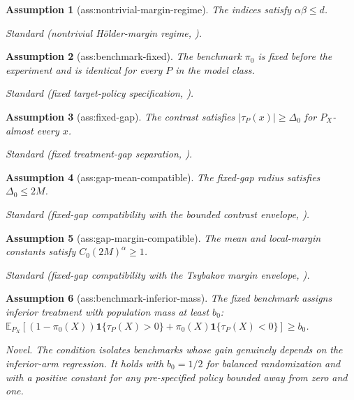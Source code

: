 \documentclass{article}
\newtheorem{assumption}{Assumption}
\begin{document}
\begin{assumption}[ass:nontrivial-margin-regime]\label{ass:nontrivial-margin-regime}
The indices satisfy \(\alpha\beta\le d\).
\par\smallskip\noindent\emph{Standard} (nontrivial Hölder-margin regime, \cite{PerchetRigollet2013CovariateBandits}).
\end{assumption}

\begin{assumption}[ass:benchmark-fixed]\label{ass:benchmark-fixed}
The benchmark \(\pi_0\) is fixed before the experiment and is identical for every \(P\) in the model class.
\par\smallskip\noindent\emph{Standard} (fixed target-policy specification, \cite{WaudbySmithEtAl2024AnytimeOffPolicy}).
\end{assumption}

\begin{assumption}[ass:fixed-gap]\label{ass:fixed-gap}
The contrast satisfies \(|\tau_P(x)|\ge\Delta_0\) for \(P_X\)-almost every \(x\).
\par\smallskip\noindent\emph{Standard} (fixed treatment-gap separation, \cite{SimchiLeviWang2023BanditExperimentalDesign}).
\end{assumption}

\begin{assumption}[ass:gap-mean-compatible]\label{ass:gap-mean-compatible}
The fixed-gap radius satisfies \(\Delta_0\le2M\).
\par\smallskip\noindent\emph{Standard} (fixed-gap compatibility with the bounded contrast envelope, \cite{SimchiLeviWang2023BanditExperimentalDesign}).
\end{assumption}

\begin{assumption}[ass:gap-margin-compatible]\label{ass:gap-margin-compatible}
The mean and local-margin constants satisfy \(C_0(2M)^\alpha\ge1\).
\par\smallskip\noindent\emph{Standard} (fixed-gap compatibility with the Tsybakov margin envelope, \cite{PerchetRigollet2013CovariateBandits}).
\end{assumption}

\begin{assumption}[ass:benchmark-inferior-mass]\label{ass:benchmark-inferior-mass}
The fixed benchmark assigns inferior treatment with population mass at least \(b_0\): \(\mathbb E_{P_X}[(1-\pi_0(X))\mathbf 1\{\tau_P(X)>0\}+\pi_0(X)\mathbf 1\{\tau_P(X)<0\}]\ge b_0\).
\par\smallskip\noindent\emph{Novel.} The condition isolates benchmarks whose gain genuinely depends on the inferior-arm regression. It holds with \(b_0=1/2\) for balanced randomization and with a positive constant for any pre-specified policy bounded away from zero and one.
\end{assumption}
\end{document}
